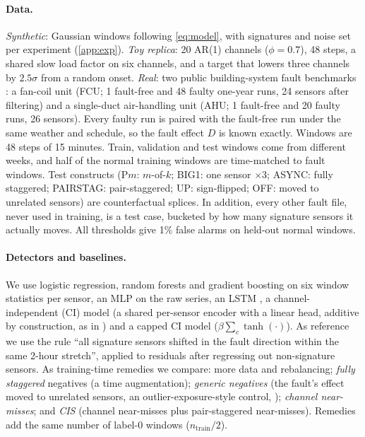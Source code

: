 \documentclass{article}
\theoremstyle{definition}
\theoremstyle{remark}
\renewcommand{\1}{\mathbf{1}}
\begin{document}
\paragraph{Data.} \emph{Synthetic}: Gaussian windows following \cref{eq:model}, with signatures and noise set per experiment (\cref{app:exp}). \emph{Toy replica}: 20 AR(1) channels ($\phi=0.7$), 48 steps, a shared slow load factor on six channels, and a target that lowers three channels by $2.5\sigma$ from a random onset. \emph{Real}: two public building-system fault benchmarks \citep{granderson2023}: a fan-coil unit (FCU; 1 fault-free and 48 faulty one-year runs, 24 sensors after filtering) and a single-duct air-handling unit (AHU; 1 fault-free and 20 faulty runs, 26 sensors). Every faulty run is paired with the fault-free run under the same weather and schedule, so the fault effect $D$ is known exactly. Windows are 48 steps of 15 minutes. Train, validation and test windows come from different weeks, and half of the normal training windows are time-matched to fault windows. Test constructs (P$m$: $m$-of-$k$; BIG1: one sensor $\times3$; ASYNC: fully staggered; PAIRSTAG: pair-staggered; UP: sign-flipped; OFF: moved to unrelated sensors) are counterfactual splices. In addition, every other fault file, never used in training, is a test case, bucketed by how many signature sensors it actually moves. All thresholds give 1\% false alarms on held-out normal windows.

\paragraph{Detectors and baselines.} We use logistic regression, random forests \citep{breiman2001} and gradient boosting \citep{friedman2001} on six window statistics per sensor, an MLP on the raw series, an LSTM \citep{hochreiter1997}, a channel-independent (CI) model (a shared per-sensor encoder with a linear head, additive by construction, as in \citealp{nie2023}) and a capped CI model ($\beta\sum_c\tanh(\cdot)$). As reference we use the rule ``all signature sensors shifted in the fault direction within the same 2-hour stretch'', applied to residuals after regressing out non-signature sensors. As training-time remedies we compare: more data and rebalancing; \emph{fully staggered} negatives (a time augmentation); \emph{generic negatives} (the fault's effect moved to unrelated sensors, an outlier-exposure-style control, \citealp{hendrycks2019}); \emph{channel near-misses}; and \emph{CIS} (channel near-misses plus pair-staggered near-misses). Remedies add the same number of label-0 windows ($n_{\mathrm{train}}/2$).
\end{document}
